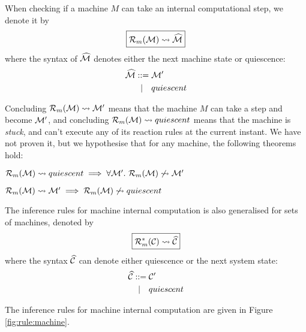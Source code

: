 
When checking if a machine $M$ can take an internal computational step, we
denote it by
\begin{equation*}
\boxed{\mathcal{R}_m(\mathcal{M}) \leadsto \widehat{\mathcal{M}}}
\end{equation*}
where the syntax of $\widehat{\mathcal{M}}$ denotes either the next machine state or quiescence:
\begin{align*}
 \widehat{\mathcal{M}} ::={}& \mathcal{M}' \\
   |\quad{}& quiescent
\end{align*}

Concluding $\mathcal{R}_m(\mathcal{M}) \leadsto \mathcal{M}'$ means that the machine $M$ can take a step
and become $\mathcal{M}'$, and concluding $\mathcal{R}_m(\mathcal{M}) \leadsto quiescent$ means that the
machine is \emph{stuck}, and can't execute any of its reaction rules at the
current instant. We have not proven it, but we hypothesise that for any
machine, the following theorems hold:
\begin{theorem}
$\mathcal{R}_m(\mathcal{M}) \leadsto quiescent \implies \forall \mathcal{M}'.~ \mathcal{R}_m(\mathcal{M}) \not\leadsto \mathcal{M}'$
\end{theorem}
\begin{theorem}
$\mathcal{R}_m(\mathcal{M}) \leadsto \mathcal{M}' \implies \mathcal{R}_m(\mathcal{M}) \not\leadsto quiescent$
\end{theorem}

The inference rules for machine internal computation is also generalised for
sets of machines, denoted by
\begin{equation*}
 \boxed{\mathcal{R}_m^*(\mathcal{C}) \leadsto \widehat{\mathcal{C}}}
\end{equation*}
where the syntax $\widehat{\mathcal{C}}$ can denote either quiescence or the next system
state:
\begin{align*}
 \widehat{\mathcal{C}} ::={}& \mathcal{C}' \\
    |\quad{}& quiescent
\end{align*}

The inference rules for machine internal computation are given in
Figure \ref{fig:rule:machine}.

